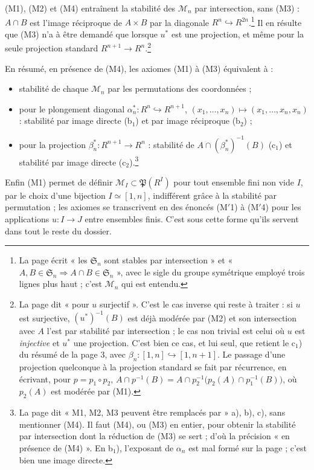 \documentclass[11pt,a4paper]{article}
\begin{document}
(M1), (M2) et (M4) entraînent la stabilité des $\mathcal{M}_n$ par
intersection, sans (M3) : $A \cap B$ est l'image réciproque de $A \times B$
par la diagonale $R^n \hookrightarrow R^{2n}$.\footnote{La page écrit « les
$\mathfrak{S}_n$ sont stables par intersection » et « $A, B \in
\mathfrak{S}_n \Rightarrow A \cap B \in \mathfrak{S}_n$ », avec le sigle du
groupe symétrique employé trois lignes plus haut ; c'est $\mathcal{M}_n$ qui
est entendu.} Il en résulte que (M3) n'a à être demandé que lorsque $u^*$ est
une projection, et même pour la seule projection standard $R^{n+1} \to
R^n$.\footnote{La page dit « pour $u$ surjectif ». C'est le cas inverse qui
reste à traiter : si $u$ est surjective, $(u^*)^{-1}(B)$ est déjà modérée par
(M2) et son intersection avec $A$ l'est par stabilité par intersection ; le
cas non trivial est celui où $u$ est \emph{injective} et $u^*$ une projection.
C'est bien ce cas, et lui seul, que retient le c$_1$) du résumé de la page 3,
avec $\beta_n : [1,n] \hookrightarrow [1,n+1]$. Le passage d'une projection
quelconque à la projection standard se fait par récurrence, en écrivant, pour
$p = p_1 \circ p_2$, $A \cap p^{-1}(B) = A \cap p_2^{-1}\bigl(p_2(A) \cap
p_1^{-1}(B)\bigr)$, où $p_2(A)$ est modérée par (M1).}

En résumé, en présence de (M4), les axiomes (M1) à (M3) équivalent à :

\begin{itemize}
\item[a)] stabilité de chaque $\mathcal{M}_n$ par les permutations des
  coordonnées ;
\item[b)] pour le plongement diagonal $\alpha_n^* : R^n \hookrightarrow
  R^{n+1}$, $(x_1, \dots, x_n) \mapsto (x_1, \dots, x_n, x_n)$ : stabilité par
  image directe (b$_1$) et par image réciproque (b$_2$) ;
\item[c)] pour la projection $\beta_n^* : R^{n+1} \to R^n$ : stabilité de $A
  \cap (\beta_n^*)^{-1}(B)$ (c$_1$) et stabilité par image directe (c$_2$).\footnote{La page dit « M1, M2, M3 peuvent être remplacés par » a), b), c),
sans mentionner (M4). Il faut (M4), ou (M3) en entier, pour obtenir la
stabilité par intersection dont la réduction de (M3) se sert ; d'où la
précision « en présence de (M4) ». En b$_1$), l'exposant de $\alpha_n$ est mal
formé sur la page ; c'est bien une image directe.}
\end{itemize}

Enfin (M1) permet de définir $\mathcal{M}_I \subset \mathfrak{P}(R^I)$ pour
tout ensemble fini non vide $I$, par le choix d'une bijection $I \simeq [1,n]$,
indifférent grâce à la stabilité par permutation ; les axiomes se transcrivent
en des énoncés (M$'$1) à (M$'$4) pour les applications $u : I \to J$ entre
ensembles finis. C'est sous cette forme qu'ils servent dans tout le reste du
dossier.
\end{document}
